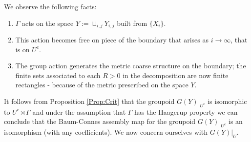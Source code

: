 \documentclass[11pt]{amsart}
\theoremstyle{plain}
\theoremstyle{definition}%
\theoremstyle{remark}%
\begin{document}
We observe the following facts: 
\begin{enumerate}
\item $\Gamma$ acts on the space $Y:=\sqcup_{i,j}Y_{i,j}$ built from $\lbrace X_{i} \rbrace$.
\item This action becomes free on piece of the boundary that arises as $i \rightarrow \infty$, that is on $U^{c}$.
\item The group action generates the metric coarse structure on the boundary; the finite sets associated to each $R>0$ in the decomposition are now finite rectangles - because of the metric prescribed on the space $Y$.
\end{enumerate} 

It follows from Proposition \ref{Prop:Crit} that the groupoid $G(Y)|_{U^{c}}$ is isomorphic to $U^{c}\rtimes \Gamma$ and under the assumption that $\Gamma$ has the Haagerup property we can conclude that the Baum-Connes assembly map for the groupoid $G(Y)|_{U^{c}}$ is an isomorphism (with any coefficients). We now concern ourselves with $G(Y)|_{U}$.
\end{document}
